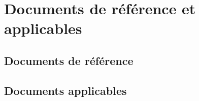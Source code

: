 
\section{Documents de référence et applicables}
    
    \subsection{Documents de référence}

    \subsection{Documents applicables}
